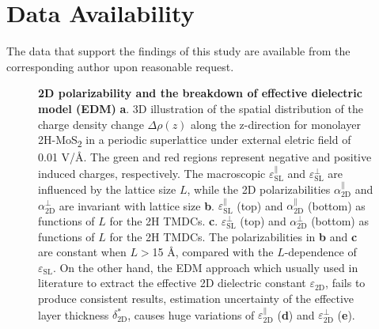 \section{Data Availability}
The data that support the findings of this study are available from
the corresponding author upon reasonable request.



% 

\label{sec:diel-org34cbe74}
\begin{figure}[H]
\centering
\caption{\label{fig-1} \textbf{2D polarizability and the breakdown of
    effective dielectric model
    (EDM)} %
  \textbf{a}. 3D illustration of the spatial distribution of the
  charge density change $\Delta \rho(z)$ along the z-direction for
  monolayer 2H-MoS\textsubscript{2} in a periodic superlattice under
  external eletric field of 0.01 V/\AA{}.  The green and red regions
  represent negative and positive induced charges, respectively. The
  macroscopic $\varepsilon_{\mathrm{SL}}^{\parallel}$ and
  $\varepsilon_{\mathrm{SL}}^{\perp}$ are influenced by the lattice
  size $L$, while the 2D polarizabilities
  $\alpha_{\mathrm{2D}}^{\parallel}$ and
  $\alpha_{\mathrm{2D}}^{\perp}$ are invariant with lattice size
  \textbf{b}.  $\varepsilon^{\parallel}_{\mathrm{SL}}$ (top) and
  $\alpha_{\mathrm{2D}}^{\parallel}$ (bottom) as functions of $L$ for
  the 2H TMDCs. \textbf{c}.  $\varepsilon^{\perp}_{\mathrm{SL}}$ (top)
  and $\alpha_{\mathrm{2D}}^{\perp}$ (bottom) as functions of $L$ for
  the 2H TMDCs. The polarizabilities in \textbf{b} and \textbf{c} are
  constant when $L>$15 \AA{}, compared with the $L$-dependence of
  $\varepsilon_{\mathrm{SL}}$. On the other hand, the EDM approach
  which usually used in literature to extract the effective 2D
  dielectric constant $\varepsilon_{\mathrm{2D}}$, fails to produce
  consistent results, estimation uncertainty of the effective layer
  thickness $\delta^{*}_{\mathrm{2D}}$, causes huge variations of
  $\varepsilon_{\mathrm{2D}}^{\parallel}$ (\textbf{d}) and
  $\varepsilon_{\mathrm{2D}}^{\perp}$ (\textbf{e}).
}
\end{figure}

